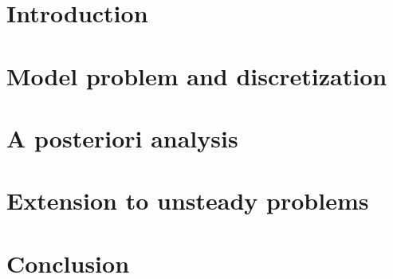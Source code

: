\documentclass[aspectratio=169]{beamer}
\begin{document}
\section{Introduction}
\subsection{}




\section{Model problem and discretization}
\subsection{}




\section{A posteriori analysis}
\subsection{}




\section{Extension to unsteady problems}
\subsection{}


%

\section{Conclusion}
\subsection{}





% 
% 
\end{document}
